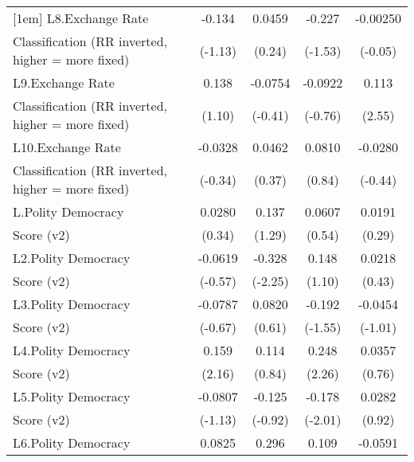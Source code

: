 {\begin{tabular}{l*{4}{c}}
[1em]
L8.Exchange Rate    &      -0.134         &      0.0459         &      -0.227         &    -0.00250         \\
Classification (RR inverted, higher = more fixed)&     (-1.13)         &      (0.24)         &     (-1.53)         &     (-0.05)         \\
[1em]
L9.Exchange Rate    &       0.138         &     -0.0754         &     -0.0922         &       0.113\sym{*}  \\
Classification (RR inverted, higher = more fixed)&      (1.10)         &     (-0.41)         &     (-0.76)         &      (2.55)         \\
[1em]
L10.Exchange Rate   &     -0.0328         &      0.0462         &      0.0810         &     -0.0280         \\
Classification (RR inverted, higher = more fixed)&     (-0.34)         &      (0.37)         &      (0.84)         &     (-0.44)         \\
[1em]
L.Polity Democracy  &      0.0280         &       0.137         &      0.0607         &      0.0191         \\
Score (v2)          &      (0.34)         &      (1.29)         &      (0.54)         &      (0.29)         \\
[1em]
L2.Polity Democracy &     -0.0619         &      -0.328\sym{*}  &       0.148         &      0.0218         \\
Score (v2)          &     (-0.57)         &     (-2.25)         &      (1.10)         &      (0.43)         \\
[1em]
L3.Polity Democracy &     -0.0787         &      0.0820         &      -0.192         &     -0.0454         \\
Score (v2)          &     (-0.67)         &      (0.61)         &     (-1.55)         &     (-1.01)         \\
[1em]
L4.Polity Democracy &       0.159\sym{*}  &       0.114         &       0.248\sym{*}  &      0.0357         \\
Score (v2)          &      (2.16)         &      (0.84)         &      (2.26)         &      (0.76)         \\
[1em]
L5.Polity Democracy &     -0.0807         &      -0.125         &      -0.178\sym{*}  &      0.0282         \\
Score (v2)          &     (-1.13)         &     (-0.92)         &     (-2.01)         &      (0.92)         \\
[1em]
L6.Polity Democracy &      0.0825         &       0.296\sym{**} &       0.109         &     -0.0591         \\

\end{tabular}}
